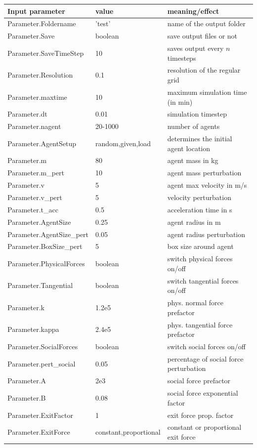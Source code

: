 \documentclass[11pt]{article}
\begin{document}
\begin{appendix}
\begin{table}
\begin{tabular}{l l l}
\hline
\textbf{Input parameter} & \textbf{value} & \textbf{meaning/effect}\\  
\hline
Parameter.Foldername & 'test' & name of the output folder\\
Parameter.Save & boolean & save output files or not\\
Parameter.SaveTimeStep & 10 & saves output every $n$ timesteps\\
Parameter.Resolution & 0.1 & resolution of the regular grid \\
Parameter.maxtime & 10 &maximum simulation time (in min)\\
Parameter.dt & 0.01 & simulation timestep\\
Parameter.nagent & 20-1000 & number of agents\\
Parameter.AgentSetup &random,given,load& determines the initial agent location\\
Parameter.m & 80 & agent mass in kg\\
Parameter.m\_pert & 10 & agent mass perturbation\\
Parameter.v & 5 & agent max velocity in m/s\\
Parameter.v\_pert & 5 & velocity perturbation\\
Parameter.t\_acc & 0.5 & acceleration time in s\\
Parameter.AgentSize & 0.25 & agent radius in m\\
Parameter.AgentSize\_pert & 0.05 & agent radius perturbation\\ 
Parameter.BoxSize\_pert & 5 & box size around agent\\ 
Parameter.PhysicalForces & boolean & switch physical forces on/off\\
Parameter.Tangential & boolean & switch tangential forces on/off\\
Parameter.k & 1.2e5 & phys. normal force prefactor\\
Parameter.kappa & 2.4e5 & phys. tangential force prefactor\\
Parameter.SocialForces & boolean & switch social forces on/off\\
Parameter.pert\_social & 0.05 & percentage of social force perturbation\\
Parameter.A & 2e3 & social force prefactor\\
Parameter.B & 0.08 & social force exponential factor\\
Parameter.ExitFactor & 1  & exit force prop. factor \\
Parameter.ExitForce & constant,proportional & constant or proportional exit force\\


\end{tabular}
\end{table}
\end{appendix}
\end{document}

